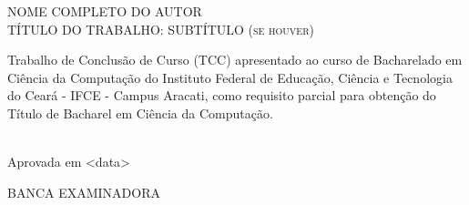 \begin{folhadeaprovacao}
\vfill
\begin{center}

{NOME COMPLETO DO AUTOR\\}
\vspace{1.5cm}
{\textsc{TÍTULO DO TRABALHO: SUBTÍTULO (se houver)}\\}
\vspace{1.5cm}
\hspace{.45\linewidth}
\begin{minipage}{.50\linewidth}
Trabalho de Conclusão de Curso (TCC) apresentado ao curso de Bacharelado em Ciência da Computação do Instituto Federal de Educação, Ciência e Tecnologia do Ceará - IFCE - Campus Aracati, como requisito parcial para obtenção do Título de Bacharel em Ciência da Computação. 
\end{minipage}
\vspace{1.0 cm}

\end{center}

\noindent\\
{Aprovada em <data>}

\vspace{1.5 cm}
\begin{center}
{BANCA EXAMINADORA}

\end{center}
\end{folhadeaprovacao}